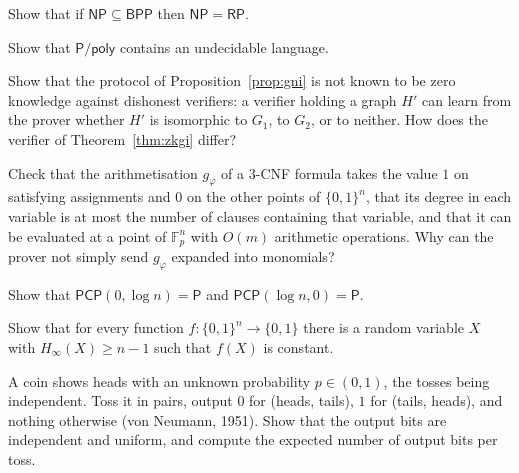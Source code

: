 \begin{exercise}[$\star\star$]\label{ex:npbpp}
Show that if $\mathsf{NP}\subseteq\mathsf{BPP}$ then $\mathsf{NP}=\mathsf{RP}$.
\end{exercise}

\begin{exercise}[$\star$]\label{ex:advice}
Show that $\mathsf P/\mathsf{poly}$ contains an undecidable language.
\end{exercise}

\begin{exercise}[$\star\star$]\label{ex:gninozk}
Show that the protocol of Proposition~\ref{prop:gni} is not known to be zero knowledge against dishonest verifiers: a verifier holding a graph $H'$ can learn from the prover whether $H'$ is isomorphic to $G_1$, to $G_2$, or to neither. How does the verifier of Theorem~\ref{thm:zkgi} differ?
\end{exercise}

\begin{exercise}[$\star$]\label{ex:arith}
Check that the arithmetisation $g_\varphi$ of a 3-CNF formula takes the value $1$ on satisfying assignments and $0$ on the other points of $\{0,1\}^n$, that its degree in each variable is at most the number of clauses containing that variable, and that it can be evaluated at a point of $\mathbb F_p^n$ with $O(m)$ arithmetic operations. Why can the prover not simply send $g_\varphi$ expanded into monomials?
\end{exercise}

\begin{exercise}[$\star$]\label{ex:pcpeasy}
Show that $\mathsf{PCP}(0,\log n)=\mathsf P$ and $\mathsf{PCP}(\log n,0)=\mathsf P$.
\end{exercise}

\begin{exercise}[$\star$]\label{ex:nodetextract}
Show that for every function $f:\{0,1\}^n\to\{0,1\}$ there is a random variable $X$ with $H_\infty(X)\ge n-1$ such that $f(X)$ is constant.
\end{exercise}

\begin{exercise}[$\star$]\label{ex:vonneumann}
A coin shows heads with an unknown probability $p\in(0,1)$, the tosses being independent. Toss it in pairs, output $0$ for (heads, tails), $1$ for (tails, heads), and nothing otherwise (von Neumann, 1951). Show that the output bits are independent and uniform, and compute the expected number of output bits per toss.
\end{exercise}

